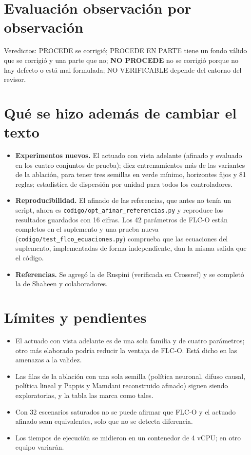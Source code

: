 \documentclass[10pt,a4paper]{article}
\newcommand{\FLC}{FLC-O}
\newcommand{\PMR}{Pappis y Mamdani reconstruido}
\begin{document}
\section{Evaluación observación por observación}
\label{sec:tabla}

Veredictos: \colorbox{okverde}{PROCEDE} se corrigió; \colorbox{okamarillo}{PROCEDE EN PARTE} tiene un fondo válido que se corrigió y una parte que no; \colorbox{okrojo}{\textbf{NO PROCEDE}} no se corrigió porque no hay defecto o está mal formulada; \colorbox{okgris}{NO VERIFICABLE} depende del entorno del revisor.



\section{Qué se hizo además de cambiar el texto}

\begin{itemize}
\item \textbf{Experimentos nuevos.} El actuado con vista adelante (afinado y evaluado en los cuatro conjuntos de prueba); diez entrenamientos más de las variantes de la ablación, para tener tres semillas en verde mínimo, horizontes fijos y 81 reglas; estadística de dispersión por unidad para todos los controladores.
\item \textbf{Reproducibilidad.} El afinado de las referencias, que antes no tenía un script, ahora es \texttt{codigo/opt\_afinar\_referencias.py} y reproduce los resultados guardados con 16 cifras. Los 42 parámetros de \FLC{} están completos en el suplemento y una prueba nueva (\texttt{codigo/test\_flco\_ecuaciones.py}) comprueba que las ecuaciones del suplemento, implementadas de forma independiente, dan la misma salida que el código.
\item \textbf{Referencias.} Se agregó la de Ruspini (verificada en Crossref) y se completó la de Shaheen y colaboradores.
\end{itemize}

\section{Límites y pendientes}
\begin{itemize}
\item El actuado con vista adelante es de una sola familia y de cuatro parámetros; otro más elaborado podría reducir la ventaja de \FLC{}. Está dicho en las amenazas a la validez.
\item Las filas de la ablación con una sola semilla (política neuronal, difuso causal, política lineal y \PMR{} afinado) siguen siendo exploratorias, y la tabla las marca como tales.
\item Con 32 escenarios saturados no se puede afirmar que \FLC{} y el actuado afinado sean equivalentes, solo que no se detecta diferencia.
\item Los tiempos de ejecución se midieron en un contenedor de 4 vCPU; en otro equipo variarán.
\end{itemize}
\end{document}
